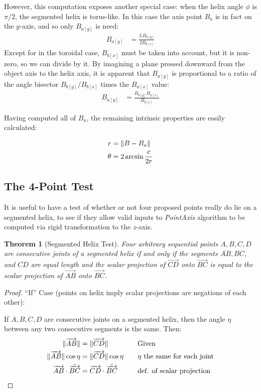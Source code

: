 \documentclass[11pt]{article}
\DeclarePairedDelimiter{\norm}{\lVert}{\rVert}
\newtheorem{theorem}{Theorem}
\begin{document}
{However, this computation exposes another special case: when the
helix angle $\phi$ is $\pi /2$, the segmented helix is
torus-like. In this case the axis point $B_a$ is in fact
on the $y$-axis, and so only $B_{a[y]}$ is need:
\begin{align}
  B_{a[y]} &=  \frac{L B_{b[y]}}{2 B_{b[z]}}
\end{align}
Except for in the toroidal case,  $B_{b[x]}$ must be taken into
account, but it is non-zero, so we can divide by it.
By imagining a plane pressed downward from the
object axis to the helix axis, it is apparent that $B_{a[y]}$
is proportional to a ratio of the angle bisector
$B_{b[y]}/B_{b[x]}$ times the $B_{a[x]}$ value:
\begin{align}
  B_{a[y]} &=  \frac{ B_{b[y]} B_{a[x]}}{ B_{b[x]}}
\end{align}

Having computed all of $B_a$, the remaining intrinsic properties are easily
calculated:

\begin{align}
  r &= \norm{B - B_a}  \\
  \theta &= 2 \arcsin{\frac{c}{2r}}
\end{align}


\subsection{The 4-Point Test}

It is useful to have a test of whether or not four proposed points really do lie on a segmented helix, to see
if they allow valid inputs to {\em PointAxis} algorithm to be computed via rigid
transformation to the $z$-axis.

\begin{theorem}[Segmented Helix Test]
  Four arbitrary sequential points $A,B,C,D$ are consecutive joints of a segmented helix if and only if
  the segments $\overline{AB},\overline{BC}$, and $\overline{CD}$ are equal length and the scalar projection
  of $\overrightarrow{CD}$ onto $\overrightarrow{BC}$ is equal to the scalar projection of $\overrightarrow{AB}$
  onto $\overrightarrow{BC}$.
\end{theorem}

\begin{proof}
  ``If'' Case (points on helix imply scalar projections are negations of each other):

  If $A,B,C,D$ are consecutive joints on a segmented helix, then the angle $\eta$ between any two consecutive segments is the
  same. Then:
  \begin{alignat*}{2}
    \norm{\overrightarrow{AB}} &= \norm{\overrightarrow{CD}} &\quad &\text{Given}\\
    \norm{\overrightarrow{AB}}\cos{\eta} &= \norm{\overrightarrow{CD}}\cos{\eta} &\quad &\text{$\eta$ the same for each joint} \\
    \overrightarrow{AB} \cdot \hat{\overrightarrow{BC}} &= \overrightarrow{CD} \cdot \hat{\overrightarrow{BC}} &\quad &\text{def. of scalar projection} \\
  \end{alignat*}


\end{proof}}
\end{document}
